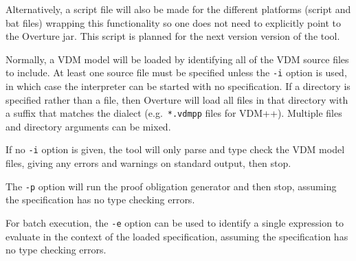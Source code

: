 \documentclass{overturerepchap}
\begin{document}
Alternatively, a script file will also be made for the different platforms
(script and bat files) wrapping this functionality so one does not need to
explicitly point to the Overture jar.  This script is planned for the next
version version of the tool.

Normally, a VDM model will be loaded by identifying all of the VDM source files
to include. At least one source file must be specified unless the \texttt{-i}
option is used, in which case the interpreter can be started with no
specification. If a directory is specified rather than a file, then Overture
will load all files in that directory with a suffix that matches the dialect
(e.g.\ \texttt{*.vdmpp} files for VDM++).  Multiple files and directory
arguments can be mixed.

If no \texttt{-i} option is given, the tool will only parse and type check
the VDM model files, giving any errors and warnings on
standard output, then stop.

The \texttt{-p} option will run the proof obligation generator and
then stop, assuming the specification has no type checking errors.

For batch execution, the \texttt{-e} option can be used to identify a
single expression to evaluate in the context of the loaded
specification, assuming the specification has no type checking errors.




\lstset{style=tool,language=}
\end{document}
